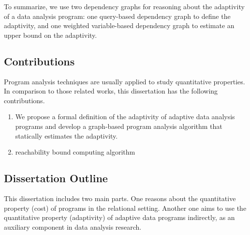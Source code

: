 {To summarize, we use two dependency graphs for reasoning about the adaptivity of a data analysis program: 
one query-based dependency graph to define the adaptivity, and one weighted variable-based dependency graph to estimate an upper bound on the adaptivity. }

\subsection{Contributions}

Program analysis techniques are usually applied to study quantitative properties. In comparison to those related works, this dissertation has the following contributions.

\begin{enumerate}

\item We propose a formal definition of the adaptivity of adaptive data analysis programs and develop a graph-based program analysis algorithm that statically estimates the adaptivity.
\item reachability bound computing algorithm
\end{enumerate}

\subsection{Dissertation Outline}
This dissertation includes two main parts. 
One reasons about the quantitative property (cost) of programs in the relational setting. Another one aims to use the quantitative property (adaptivity) of adaptive data programs indirectly, as an auxiliary component in data analysis research.

